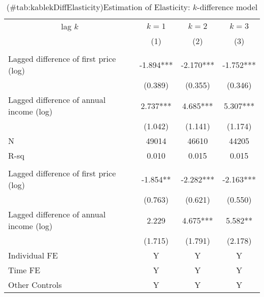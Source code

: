 \documentclass[
]{article}
\begin{document}
\begin{table}

\caption{(\#tab:kablekDiffElasticity)Estimation of Elasticity: $k$-difference model}
\centering
\fontsize{7}{9}\selectfont
\begin{threeparttable}
\begin{tabular}[t]{lccc}
\toprule
\multicolumn{1}{c}{lag $k$} & \multicolumn{1}{c}{$k = 1$} & \multicolumn{1}{c}{$k = 2$} & \multicolumn{1}{c}{$k = 3$} \\
\cmidrule(l{3pt}r{3pt}){1-1} \cmidrule(l{3pt}r{3pt}){2-2} \cmidrule(l{3pt}r{3pt}){3-3} \cmidrule(l{3pt}r{3pt}){4-4}
 & (1) & (2) & (3)\\
\midrule
\addlinespace[0.3em]
\multicolumn{4}{l}{\textbf{Overall Elasticity}}\\
\hspace{1em}Lagged difference of first price (log) & -1.894*** & -2.170*** & -1.752***\\
\hspace{1em} & (0.389) & (0.355) & (0.346)\\
\hspace{1em}Lagged difference of annual income (log) & 2.737*** & 4.685*** & 5.307***\\
\hspace{1em} & (1.042) & (1.141) & (1.174)\\
\hspace{1em}N & 49014 & 46610 & 44205\\
\hspace{1em}R-sq & 0.010 & 0.015 & 0.015\\
\addlinespace[0.3em]
\multicolumn{4}{l}{\textbf{Intensive-Margin Elasticity}}\\
\hspace{1em}Lagged difference of first price (log) & -1.854** & -2.282*** & -2.163***\\
\hspace{1em} & (0.763) & (0.621) & (0.550)\\
\hspace{1em}Lagged difference of annual income (log) & 2.229 & 4.675*** & 5.582**\\
\hspace{1em} & (1.715) & (1.791) & (2.178)\\
\hspace{1em}Individual FE & Y & Y & Y\\
\hspace{1em}Time FE & Y & Y & Y\\
\hspace{1em}Other Controls & Y & Y & Y\\

\end{tabular}
\end{threeparttable}
\end{table}
\end{document}

